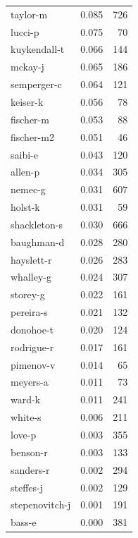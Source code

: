 \documentclass{vldb}
\begin{document}
\begin{appendix}
\begin{supertabular}{ l r r }
taylor-m       &                 0.085 &     726 \\
lucci-p        &                 0.075 &      70 \\
kuykendall-t   &                 0.066 &     144 \\
mckay-j        &                 0.065 &     186 \\
semperger-c    &                 0.064 &     121 \\
keiser-k       &                 0.056 &      78 \\
fischer-m      &                 0.053 &      88 \\
fischer-m2     &                 0.051 &      46 \\
saibi-e        &                 0.043 &     120 \\
allen-p        &                 0.034 &     305 \\
nemec-g        &                 0.031 &     607 \\
holst-k        &                 0.031 &      59 \\
shackleton-s   &                 0.030 &     666 \\
baughman-d     &                 0.028 &     280 \\
hayslett-r     &                 0.026 &     283 \\
whalley-g      &                 0.024 &     307 \\
storey-g       &                 0.022 &     161 \\
pereira-s      &                 0.021 &     132 \\
donohoe-t      &                 0.020 &     124 \\
rodrigue-r     &                 0.017 &     161 \\
pimenov-v      &                 0.014 &      65 \\
meyers-a       &                 0.011 &      73 \\
ward-k         &                 0.011 &     241 \\
white-s        &                 0.006 &     211 \\
love-p         &                 0.003 &     355 \\
benson-r       &                 0.003 &     133 \\
sanders-r      &                 0.002 &     294 \\
steffes-j      &                 0.002 &     129 \\
stepenovitch-j &                 0.001 &     191 \\
bass-e         &                 0.000 &     381 \\
\bottomrule
\end{supertabular}



\end{appendix}
\end{document}
